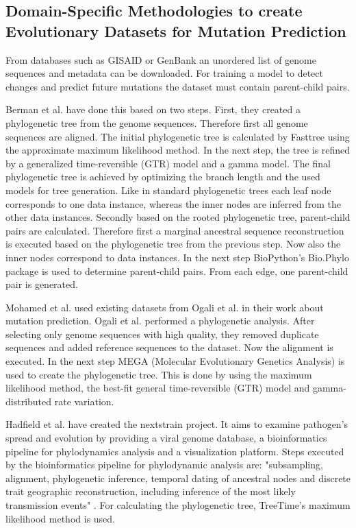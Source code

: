 \subsection{Domain-Specific Methodologies to create Evo\-lu\-tio\-na\-ry Datasets for Mutation Prediction} \label{fundamentalsD}

From databases such as \ac{GISAID} or GenBank an unordered list of genome sequences and metadata can be downloaded. For training a model to detect changes and predict future mutations the dataset must contain parent-child pairs.

Berman et al. \cite{Berman2020} have done this based on two steps. First, they created a phylogenetic tree from the genome sequences. Therefore first all genome sequences are aligned. The initial phylogenetic tree is calculated by Fasttree using the approximate maximum likelihood method. In the next step, the tree is refined by a generalized time-reversible (GTR) model and a gamma model. The final phylogenetic tree is achieved by optimizing the branch length and the used models for tree generation. Like in standard phylogenetic trees each leaf node corresponds to one data instance, whereas the inner nodes are inferred from the other data instances.
Secondly based on the rooted phylogenetic tree, parent-child pairs are calculated. Therefore first a marginal ancestral sequence reconstruction is executed based on the phylogenetic tree from the previous step. Now also the inner nodes correspond to data instances. In the next step BioPython's \cite{10.1093/bioinformatics/btp163} Bio.Phylo package is used to determine parent-child pairs. From each edge, one parent-child pair is generated. \cite{Berman2020}

Mohamed et al. \cite{Mohamed2021} used existing datasets from Ogali et al. \cite{ogaliMolecularCharacterizationNewcastle2018} in their work about mutation prediction. Ogali et al. \cite{ogaliMolecularCharacterizationNewcastle2018} performed a phylogenetic analysis. After selecting only genome sequences with high quality, they removed duplicate sequences and added reference sequences to the dataset. Now the alignment is executed. In the next step MEGA (Molecular Evo\-lu\-tio\-na\-ry Genetics Analysis) is used to create the phylogenetic tree. This is done by using the maximum likelihood method, the best-fit general time-reversible (GTR) model and gamma-distributed rate variation.

Hadfield et al. \cite{10.1093/bioinformatics/bty407} have created the nextstrain project. It aims to examine pathogen's spread and evolution by providing a viral genome database, a bioinformatics pipeline for phylodynamics analysis and a visualization plat\-form. Steps executed by the bioinformatics pipeline for phylodynamic analysis are: "subsampling, alignment, phylogenetic inference, temporal dating of ancestral nodes and discrete trait geographic reconstruction, including in\-fe\-rence of the most likely transmission events" \cite{10.1093/bioinformatics/bty407}. For calculating the phylogenetic tree, TreeTime's maximum likelihood method is used. \cite{10.1093/bioinformatics/bty407}

